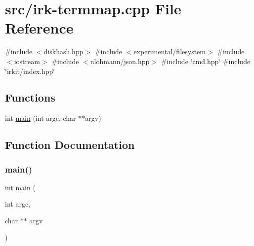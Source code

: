 \hypertarget{irk-termmap_8cpp}{}\section{src/irk-\/termmap.cpp File Reference}
\label{irk-termmap_8cpp}
{\ttfamily \#include $<$diskhash.\+hpp$>$}\newline
{\ttfamily \#include $<$experimental/filesystem$>$}\newline
{\ttfamily \#include $<$iostream$>$}\newline
{\ttfamily \#include $<$nlohmann/json.\+hpp$>$}\newline
{\ttfamily \#include \char`\"{}cmd.\+hpp\char`\"{}}\newline
{\ttfamily \#include \char`\"{}irkit/index.\+hpp\char`\"{}}\newline
\subsection*{Functions}
\begin{DoxyCompactItemize}
\item 
int \mbox{\hyperlink{irk-termmap_8cpp_a3c04138a5bfe5d72780bb7e82a18e627}{main}} (int argc, char $\ast$$\ast$argv)
\end{DoxyCompactItemize}


\subsection{Function Documentation}
\mbox{\label{irk-termmap_8cpp_a3c04138a5bfe5d72780bb7e82a18e627}} 
\subsubsection{\texorpdfstring{main()}{main()}}
{\footnotesize\ttfamily int main (\begin{DoxyParamCaption}\item[{int}]{argc,  }\item[{char $\ast$$\ast$}]{argv }\end{DoxyParamCaption})}

